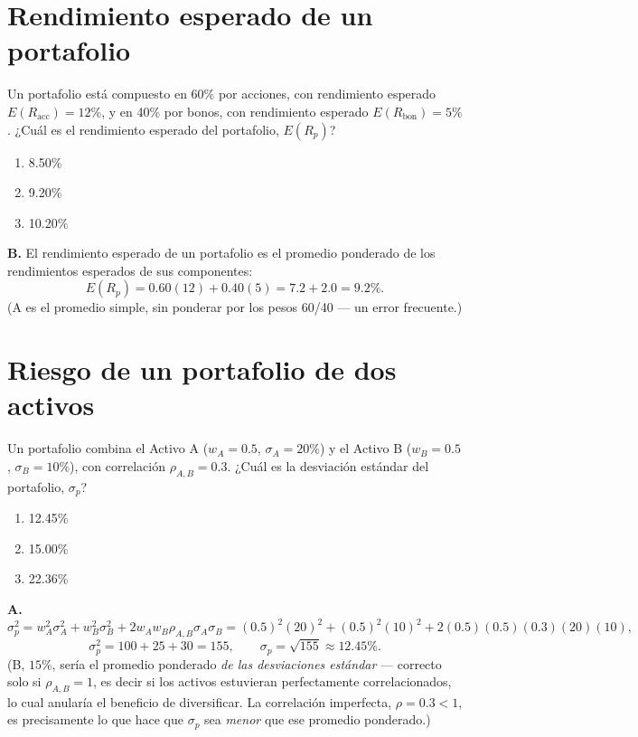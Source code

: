 \documentclass[11pt,a4paper,oneside]{article}
\theoremstyle{definition}
\begin{document}
\section{Rendimiento esperado de un portafolio}

\begin{cfaBox}
Un portafolio está compuesto en 60\% por acciones, con rendimiento
esperado $E(R_{\text{acc}})=12\%$, y en 40\% por bonos, con
rendimiento esperado $E(R_{\text{bon}})=5\%$. ¿Cuál es el rendimiento
esperado del portafolio, $E(R_p)$?
\begin{enumerate}[label=\Alph*.]
\item 8.50\%
\item 9.20\%
\item 10.20\%
\end{enumerate}
\end{cfaBox}
\begin{solBox}
\textbf{B.} El rendimiento esperado de un portafolio es el promedio
ponderado de los rendimientos esperados de sus componentes:
\[
E(R_p)=0.60(12)+0.40(5)=7.2+2.0=9.2\%.
\]
(A es el promedio simple, sin ponderar por los pesos 60/40 --- un error
frecuente.)
\end{solBox}

\section{Riesgo de un portafolio de dos activos}

\begin{cfaBox}
Un portafolio combina el Activo A ($w_A=0.5$, $\sigma_A=20\%$) y el
Activo B ($w_B=0.5$, $\sigma_B=10\%$), con correlación
$\rho_{A,B}=0.3$. ¿Cuál es la desviación estándar del portafolio,
$\sigma_p$?
\begin{enumerate}[label=\Alph*.]
\item 12.45\%
\item 15.00\%
\item 22.36\%
\end{enumerate}
\end{cfaBox}
\begin{solBox}
\textbf{A.}
\[
\sigma_p^2=w_A^2\sigma_A^2+w_B^2\sigma_B^2+2w_Aw_B\rho_{A,B}\sigma_A\sigma_B
=(0.5)^2(20)^2+(0.5)^2(10)^2+2(0.5)(0.5)(0.3)(20)(10),
\]
\[
\sigma_p^2=100+25+30=155, \qquad \sigma_p=\sqrt{155}\approx12.45\%.
\]
(B, $15\%$, sería el promedio ponderado \emph{de las desviaciones
estándar} --- correcto solo si $\rho_{A,B}=1$, es decir si los activos
estuvieran perfectamente correlacionados, lo cual anularía el beneficio de
diversificar. La correlación imperfecta, $\rho=0.3<1$, es precisamente lo
que hace que $\sigma_p$ sea \emph{menor} que ese promedio ponderado.)
\end{solBox}
\end{document}
